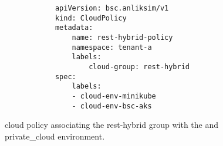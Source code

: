 \documentclass[../main.tex]{subfiles}
\begin{document}
    \begin{figure}[h]
        \begin{verbatim}
            apiVersion: bsc.anliksim/v1
            kind: CloudPolicy
            metadata:
                name: rest-hybrid-policy
                namespace: tenant-a
                labels:
                    cloud-group: rest-hybrid
            spec:
                labels:
                - cloud-env-minikube
                - cloud-env-bsc-aks
        \end{verbatim}
        \captionsetup{justification=centering}
        \caption{
            \Gls{cloud} policy associating the rest-hybrid group with the  and \gls{private_cloud} environment.
        }
        \label{lst:cloud_policy}
    \end{figure}
\end{document}
